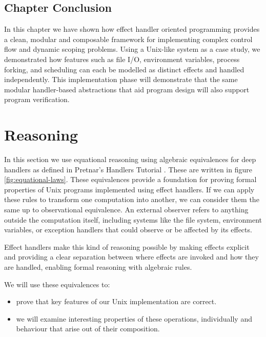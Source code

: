 \documentclass[logo,bsc,singlespacing,parskip]{infthesis}
\begin{document}
\section{Chapter Conclusion}

In this chapter we have shown how effect handler oriented programming provides a clean, modular and composable framework for implementing complex control flow and dynamic scoping problems. Using a Unix-like system as a case study, we demonstrated how features such as file I/O, environment variables, process forking, and scheduling can each be modelled as distinct effects and handled independently. This implementation phase will demonstrate that the same modular handler-based abstractions that aid program design will also support program verification.




\chapter{Reasoning}

In this section we use equational reasoning using algebraic equivalences for deep handlers as defined in Pretnar's Handlers Tutorial \cite{pretnar_introduction_2015}. These are written in figure \ref{fig:equational-laws}.  These equivalences provide a foundation for proving formal properties of Unix programs implemented using effect handlers. If we can apply these rules to transform one computation into another, we can consider them the same up to observational equivalence.
An external observer refers to anything outside the computation itself, including systems like the file system, environment variables, or exception handlers that could observe or be affected by its effects.

Effect handlers make this kind of reasoning possible by making effects explicit and providing a clear separation between where effects are invoked and how they are handled, enabling formal reasoning with algebraic rules.

We will use these equivalences to:
\begin{itemize}
    \item prove that key features of our Unix implementation are correct. 
    \item we will examine interesting properties of these operations, individually and behaviour that arise out of their composition. 
\end{itemize}
\end{document}
